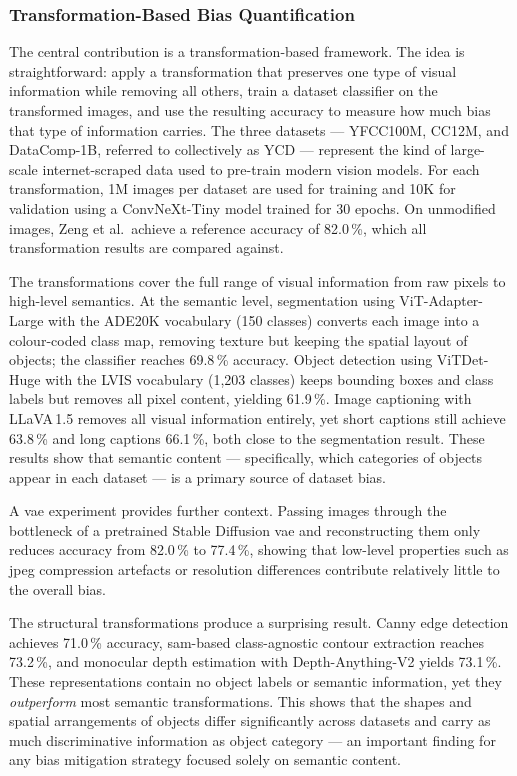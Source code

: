 \subsubsection*{Transformation-Based Bias Quantification}

The central contribution is a transformation-based framework. The idea is straightforward:
apply a transformation that preserves one type of visual information while removing all
others, train a dataset classifier on the transformed images, and use the resulting accuracy
to measure how much bias that type of information carries. The three datasets --- YFCC100M,
CC12M, and DataComp-1B, referred to collectively as YCD --- represent the kind of large-scale
internet-scraped data used to pre-train modern vision models. For each transformation, 1M
images per dataset are used for training and 10K for validation using a ConvNeXt-Tiny model
trained for 30 epochs. On unmodified images, Zeng et al.\ achieve a reference accuracy of
82.0\,\%, which all transformation results are compared against.

The transformations cover the full range of visual information from raw pixels to high-level
semantics. At the semantic level, segmentation using ViT-Adapter-Large with the ADE20K
vocabulary (150 classes) converts each image into a colour-coded class map, removing texture
but keeping the spatial layout of objects; the classifier reaches 69.8\,\% accuracy. Object
detection using ViTDet-Huge with the LVIS vocabulary (1,203 classes) keeps bounding boxes
and class labels but removes all pixel content, yielding 61.9\,\%. Image captioning with
LLaVA\,1.5 removes all visual information entirely, yet short captions still achieve
63.8\,\% and long captions 66.1\,\%, both close to the segmentation result. These results
show that semantic content --- specifically, which categories of objects appear in each
dataset --- is a primary source of dataset bias.

A \acrshort{vae} experiment provides further context. Passing images through the bottleneck
of a pretrained Stable Diffusion \acrshort{vae} and reconstructing them only reduces accuracy
from 82.0\,\% to 77.4\,\%, showing that low-level properties such as jpeg
compression artefacts or resolution differences contribute relatively little to the overall
bias.

The structural transformations produce a surprising result. Canny edge detection achieves
71.0\,\% accuracy, \acrshort{sam}-based class-agnostic contour extraction reaches 73.2\,\%,
and monocular depth estimation with Depth-Anything-V2 yields 73.1\,\%. These representations
contain no object labels or semantic information, yet they \emph{outperform} most semantic
transformations. This shows that the shapes and spatial arrangements of objects differ
significantly across datasets and carry as much discriminative information as object category
--- an important finding for any bias mitigation strategy focused solely on semantic content.

